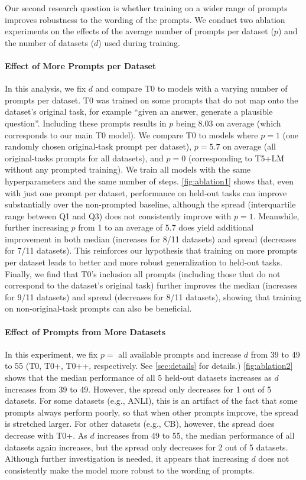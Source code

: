 Our second research question is whether training on a wider range of prompts improves robustness to the wording of the prompts. We conduct two ablation experiments on the effects of the average number of prompts per dataset ($p$) and the number of datasets ($d$) used during training.

\paragraph{Effect of More Prompts per Dataset} 

In this analysis, we fix $d$ and compare T0 to models with a varying number of prompts per dataset. T0 was trained on some prompts that do not map onto the dataset's original task, for example ``given an answer, generate a plausible question''. Including these prompts results in $p$ being $8.03$ on average (which corresponds to our main T0 model). We compare T0 to models where $p = 1$ (one randomly chosen original-task prompt per dataset), $p = 5.7$ on average (all original-tasks prompts for all datasets), and $p = 0$ (corresponding to T5+LM without any prompted training). We train all models with the same hyperparameters and the same number of steps. \autoref{fig:ablation1} shows that, even with just one prompt per dataset, performance on held-out tasks can improve substantially over the non-prompted baseline, although the spread (interquartile range between Q1 and Q3) does not consistently improve with $p = 1$. Meanwhile, further increasing $p$ from 1 to an average of 5.7 does yield additional improvement in both median (increases for 8/11 datasets) and spread (decreases for 7/11 datasets). This reinforces our hypothesis that training on more prompts per dataset leads to better and more robust generalization to held-out tasks. Finally, we find that T0's inclusion all prompts (including those that do not correspond to the dataset's original task) further improves the median (increases for 9/11 datasets) and spread (decreases for 8/11 datasets), showing that training on non-original-task prompts can also be beneficial.

\paragraph{Effect of Prompts from More Datasets} In this experiment, we fix $p = $ all available prompts and increase $d$ from 39 to 49 to 55 (T0, T0+, T0++, respectively. See \autoref{sec:details} for details.) \autoref{fig:ablation2} shows that the median performance of all 5 held-out datasets increases as $d$ increases from 39 to 49. However, the spread only decreases for 1 out of 5 datasets. For some datasets (e.g., ANLI), this is an artifact of the fact that some prompts always perform poorly, so that when other prompts improve, the spread is stretched larger. For other datasets (e.g., CB), however, the spread does decrease with T0+. As $d$ increases from 49 to 55, the median performance of all datasets again increases, but the spread only decreases for 2 out of 5 datasets. Although further investigation is needed, it appears that increasing $d$ does not consistently make the model more robust to the wording of prompts. 

